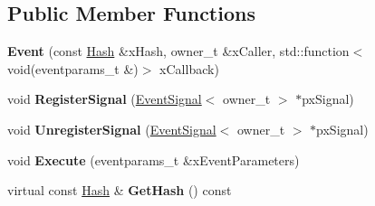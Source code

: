 \subsection*{Public Member Functions}
\begin{DoxyCompactItemize}
\item 
\hypertarget{class_k_g_e_1_1_event_a718fe1b0a1a4ff9768dea405485844ff}{{\bfseries Event} (const \hyperlink{class_k_g_e_1_1_hash}{Hash} \&x\-Hash, owner\-\_\-t \&x\-Caller, std\-::function$<$ void(eventparams\-\_\-t \&)$>$ x\-Callback)}\label{class_k_g_e_1_1_event_a718fe1b0a1a4ff9768dea405485844ff}

\item 
\hypertarget{class_k_g_e_1_1_event_a731391dcb56fc726f203ce2f0ce18d10}{void {\bfseries Register\-Signal} (\hyperlink{class_k_g_e_1_1_event_signal}{Event\-Signal}$<$ owner\-\_\-t $>$ $\ast$px\-Signal)}\label{class_k_g_e_1_1_event_a731391dcb56fc726f203ce2f0ce18d10}

\item 
\hypertarget{class_k_g_e_1_1_event_a7a62b2d97ffe3c87455160b257c2b116}{void {\bfseries Unregister\-Signal} (\hyperlink{class_k_g_e_1_1_event_signal}{Event\-Signal}$<$ owner\-\_\-t $>$ $\ast$px\-Signal)}\label{class_k_g_e_1_1_event_a7a62b2d97ffe3c87455160b257c2b116}

\item 
\hypertarget{class_k_g_e_1_1_event_a3e632d4e01b37e0f3c3fa404d73bb7fc}{void {\bfseries Execute} (eventparams\-\_\-t \&x\-Event\-Parameters)}\label{class_k_g_e_1_1_event_a3e632d4e01b37e0f3c3fa404d73bb7fc}

\item 
\hypertarget{class_k_g_e_1_1_event_a4f38ca1d86b9d319dd591eaf6cc2999a}{virtual const \hyperlink{class_k_g_e_1_1_hash}{Hash} \& {\bfseries Get\-Hash} () const }\label{class_k_g_e_1_1_event_a4f38ca1d86b9d319dd591eaf6cc2999a}

\end{DoxyCompactItemize}
